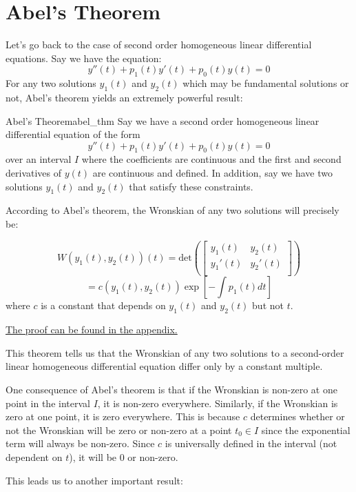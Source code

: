 \documentclass{report}
\begin{document}
\section{Abel's Theorem}
Let's go back to the case of second order homogeneous linear differential equations. Say we have the equation:
$$y''(t) + p_1(t)y'(t) + p_0(t)y(t) = 0$$
For any two solutions $y_1(t)$ and $y_2(t)$ which may be fundamental solutions or not, Abel's theorem yields an extremely powerful result:

\begin{mytheo}{Abel's Theorem}{abel_thm}
    Say we have a second order homogeneous linear differential equation of the form 
    $$y''(t) + p_1(t)y'(t) + p_0(t)y(t) = 0$$
    over an interval $I$ where the coefficients are continuous and the first and second derivatives of $y(t)$ are continuous and defined.
    In addition, say we have two solutions $y_1(t)$ and $y_2(t)$ that satisfy these constraints.
    
    According to Abel's theorem, the Wronskian of any two solutions will precisely be:
    
    $$W(y_1(t), y_2(t))(t) = \text{det}\left(\begin{bmatrix}
    y_1(t) & y_2(t) \\
    y_1'(t) & y_2'(t) \\
    \end{bmatrix}\right)$$
    $$= c(y_1(t),y_2(t))\exp{\left[-\int{p_1(t)dt}\right]}$$
    where $c$ is a constant that depends on $y_1(t)$ and $y_2(t)$ but not $t$.
\end{mytheo}

\hyperref[sec:abel]{The proof can be found in the appendix.}
\newline


This theorem tells us that the Wronskian of any two solutions to a second-order linear homogeneous differential equation differ only by a constant multiple.


One consequence of Abel's theorem is that if the Wronskian is non-zero at one point in the interval $I$, it is non-zero everywhere. Similarly, if the Wronskian is zero at one point, it is zero everywhere. This is because $c$ determines whether or not the Wronskian will be zero or non-zero at a point $t_0 \in I$ since the exponential term will always be non-zero. Since $c$ is universally defined in the interval (not dependent on $t$), it will be 0 or non-zero. 

This leads us to another important result:
\end{document}
